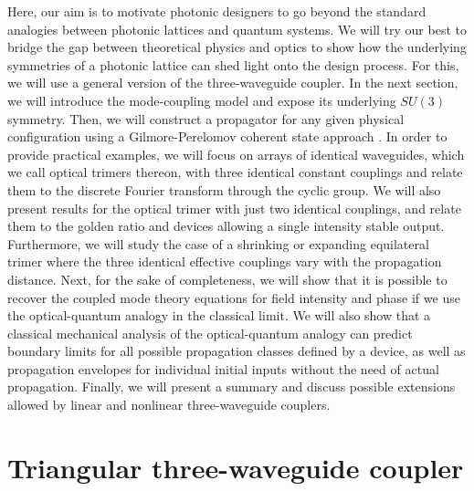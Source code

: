 \documentclass[9pt,twocolumn,twoside]{osajnl}
\begin{document}
Here, our aim is to motivate photonic designers to go beyond the standard analogies between photonic lattices and quantum systems. 
We will try our best to bridge the gap between theoretical physics and optics to show how the underlying symmetries of a photonic lattice can shed light onto the design process. 
For this, we will use a general version of the three-waveguide coupler.
In the next section, we will introduce the mode-coupling model and expose its underlying $SU(3)$ symmetry. 
Then, we will construct a propagator for any given physical configuration using a Gilmore-Perelomov coherent state approach \cite{VillanuevaVergara2015p}.
In order to provide practical examples, we will focus on arrays of identical waveguides, which we call optical trimers thereon, with three identical constant couplings and relate them to the discrete Fourier transform through the cyclic group.
We will also present results for the optical trimer with just two identical couplings, and relate them to the golden ratio and devices allowing a single intensity stable output. 
Furthermore, we will study the case of a shrinking or expanding equilateral trimer where the three identical effective couplings vary with the propagation distance.
Next, for the sake of completeness, we will show that it is possible to recover the coupled mode theory equations for field intensity and phase if we use the optical-quantum analogy in the classical limit.
We will also show that a classical mechanical analysis of the optical-quantum analogy can predict boundary limits for all possible propagation classes defined by a device, as well as propagation envelopes for individual initial inputs without the need of actual propagation.
Finally, we will present a summary and discuss possible extensions allowed by linear and nonlinear three-waveguide couplers.


\section{Triangular three-waveguide coupler}
\end{document}
